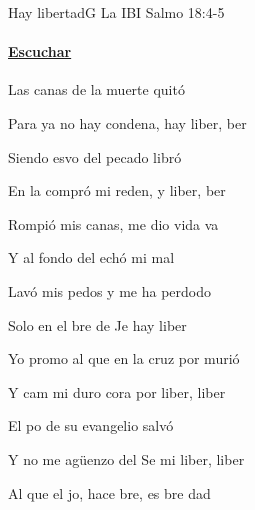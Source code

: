 \documentclass[12pt, spanish]{book}
\begin{document}
    \begin{song}{Hay libertad}{G}
    {} %
    {La IBI}
    {Salmo 18:4-5} %
    {}
        \ifChordBk
        \paragraph{\mbox{}\hfill\protect\href{https://open.spotify.com/intl-es/track/3twlf8a1oiZ8WZT8Hdkc0X}{Escuchar}\mbox{}\hfill}
        \fi



        \begin{SBOpGroup}
            Las canas de la muerte  quitó

            Para  ya no hay condena, hay liber, ber

            Siendo esvo del pecado  libró

            En la  compró mi reden, y liber, ber
        \end{SBOpGroup}

        \begin{SBChorus}
            Rompió mis canas, me dio vida va

            Y al fondo del  echó mi mal

            Lavó mis pedos y me ha perdodo

            Solo en el bre de Je hay liber~~
        \end{SBChorus}

        \begin{SBOpGroup}
            Yo promo al que en la cruz por  murió

            Y cam mi duro cora por liber, liber~

            El po de su evangelio  salvó

            Y no me agüenzo del Se mi liber, liber
        \end{SBOpGroup}

        \begin{SBOpGroup}
            Al que el jo, hace bre, es bre   dad~


\end{SBOpGroup}
\end{song}
\end{document}
